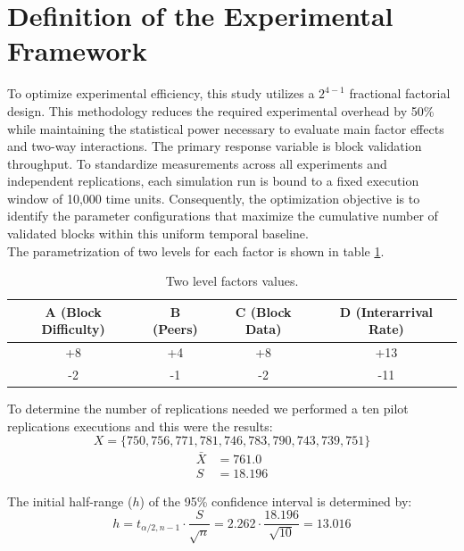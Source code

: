 \documentclass[12pt,a4paper]{article}
\begin{document}
	\section{Definition of the Experimental Framework}
	\label{sec:experimental_framework}
	
	To optimize experimental efficiency, this study utilizes a $2^{4-1}$ fractional factorial design. This methodology reduces the required experimental overhead by 50\% while maintaining the statistical power necessary to evaluate main factor effects and two-way interactions. The primary response variable is block validation throughput. To standardize measurements across all experiments and independent replications, each simulation run is bound to a fixed execution window of 10,000 time units. Consequently, the optimization objective is to identify the parameter configurations that maximize the cumulative number of validated blocks within this uniform temporal baseline.\\
	
	\noindent The parametrization of two levels for each factor is shown in table \ref{tab:factors values}.
	
	
	
	\begin{table}[htbp]
		\centering
		\begin{tabular}{cccc}
			\toprule
			\textbf{A (Block Difficulty)} & \textbf{B (Peers)} & \textbf{C (Block Data)} & \textbf{D (Interarrival Rate)} \\
			\midrule
			+8 & +4 & +8 & +13 \\
			-2 & -1 & -2 & -11 \\
			\bottomrule
		\end{tabular}
		\caption{Two level factors values.}
		\label{tab:factors values}
	\end{table}
	
	\noindent To determine the number of replications needed we performed a ten pilot replications executions and this were the results:
	\[ X = \{750, 756, 771, 781, 746, 783, 790, 743, 739, 751\} \]
	\begin{align}
		\bar{X} &= 761.0 \\
		S &= 18.196
	\end{align}
	
	\noindent The initial half-range ($h$) of the 95\% confidence interval is determined by:
	\begin{equation}
		h = t_{\alpha/2, n-1} \cdot \frac{S}{\sqrt{n}} = 2.262 \cdot \frac{18.196}{\sqrt{10}} = 13.016
	\end{equation}
	
\end{document}
